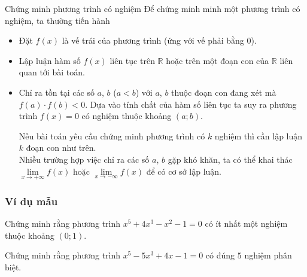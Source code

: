 \begin{dang}{Chứng minh phương trình có nghiệm}
	Để chứng minh minh một phương trình có nghiệm, ta thường tiến hành
	\begin{itemize}
		\item Đặt $f(x)$ là vế trái của phương trình (ứng với vế phải bằng $0$).
		\item Lập luận hàm số $f(x)$ liên tục trên $\mathbb{R}$ hoặc trên một đoạn con của $\mathbb{R}$ liên quan tới bài toán.
		\item Chỉ ra tồn tại các số $a$, $b$ ($a<b$) với $a$, $b$ thuộc đoạn con đang xét mà $f(a)\cdot f(b)<0$. Dựa vào tính chất của hàm số liên tục ta suy ra phương trình $f(x)=0$ có nghiệm thuộc khoảng $(a;b)$.		
		\begin{note}
			Nếu bài toán yêu cầu chứng minh phương trình có $k$ nghiệm thì cần lập luận $k$ đoạn con như trên.\\
			Nhiều trường hợp việc chỉ ra các số $a$, $b$ gặp khó khăn, ta có thể khai thác $\lim \limits _{x\to +\infty}f(x)$ hoặc $\lim \limits _{x\to -\infty}f(x)$ để có cơ sở lập luận. 
		\end{note}
	\end{itemize}
\end{dang}
\subsubsection{Ví dụ mẫu}
\begin{vd}%
	Chứng minh rằng phương trình $x^5+4x^3-x^2-1=0$ có ít nhất một nghiệm thuộc khoảng $(0;1)$.
\end{vd}
\begin{vd}%
	Chứng minh rằng phương trình $x^5-5x^3+4x-1=0$ có đúng $5$ nghiệm phân biệt.
\end{vd}

